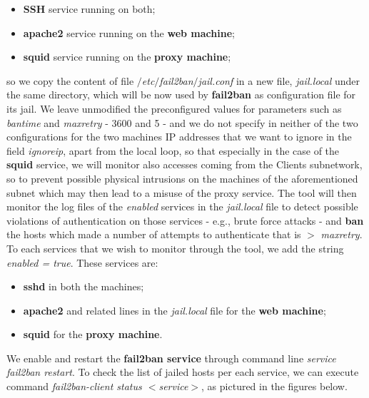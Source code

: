 \begin{itemize}
\item \textbf{SSH} service running on both;
\item \textbf{apache2} service running on the \textbf{web machine};
\item \textbf{squid} service running on the \textbf{proxy machine};
\end{itemize}

so we copy the content of file \textit{$/$etc$/$fail2ban$/$jail.conf} in a new file, \textit{jail.local} under the same directory, which will be now used by \textbf{fail2ban} as configuration file for its jail. We leave unmodified the preconfigured values for parameters such as \textit{bantime} and \textit{maxretry} - 3600 and 5 - and we do not specify in neither of the two configurations for the two machines IP addresses that we want to ignore in the field \textit{ignoreip}, apart from the local loop, so that especially in the case of the \textbf{squid} service, we will monitor also accesses coming from the Clients subnetwork, so to prevent possible physical intrusions on the machines of the aforementioned subnet which may then lead to a misuse of the proxy service. The tool will then monitor the log files of the \textit{enabled} services in the \textit{jail.local} file to detect possible violations of authentication on those services - e.g., brute force attacks - and \textbf{ban} the hosts which made a number of attempts to authenticate that is $>$ \textit{maxretry}. To each services that we wish to monitor through the tool, we add the string \textit{enabled = true}. These services are:\\

\begin{itemize}
\item \textbf{sshd} in both the machines;
\item \textbf{apache2} and related lines in the \textit{jail.local} file for the \textbf{web machine};
\item \textbf{squid} for the \textbf{proxy machine}.
\end{itemize}

We enable and restart the \textbf{fail2ban service} through command line \textit{service fail2ban restart}. To check the list of jailed hosts per each service, we can execute command \textit{fail2ban-client status $<$service$>$}, as pictured in the figures below.\\

